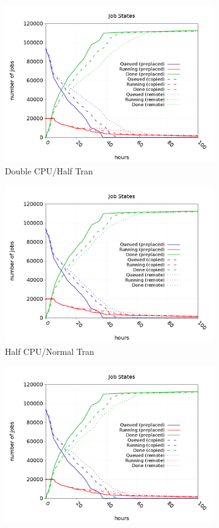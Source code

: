 \documentclass[a4paper]{jpconf}
\begin{document}
\begin{figure}
\begin{subfigure}{0.3\textwidth}
    \includegraphics[width=\textwidth]{figures/FM1_RP1CPU.png}
    \caption{Double CPU/Half Tran}
  \end{subfigure}
  \begin{subfigure}{0.3\textwidth}
    \includegraphics[width=\textwidth]{figures/FP0_RM1CPU.png}
    \caption{Half CPU/Normal Tran}
  \end{subfigure}
  \begin{subfigure}{0.3\textwidth}
    \includegraphics[width=\textwidth]{figures/FP0_RP0CPU.png}

\end{subfigure}
\end{figure}
\end{document}
